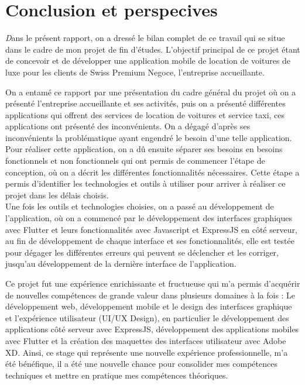 \chapter*{Conclusion et perspecives}
\vspace{1cm}
\justifying
\lettrine[findent=2pt,lines=3]{\textit{D}}{}ans le présent rapport, on a dressé le bilan complet de ce travail qui se situe dans le cadre de mon projet de fin d'études. L'objectif principal de ce projet étant de concevoir et de développer une application mobile de location de voitures de luxe pour les clients de Swiss Premium Negoce, l'entreprise accueillante.

On a entamé ce rapport par une présentation du cadre général du projet où on a présenté l'entreprise accueillante et ses activités, puis on a présenté différentes applications qui offrent des services de location de voitures et service taxi, ces applications ont présenté des inconvénients. On a dégagé d'après ses inconvénients la problématique ayant engendré le besoin d'une telle application. Pour réaliser cette application, on a dû ensuite séparer ses besoins en besoins fonctionnels et non fonctionnels qui ont permis de commencer l'étape de conception, où on a décrit les différentes fonctionnalités nécessaires. Cette étape a permis d'identifier les technologies et outils à utiliser pour arriver à réaliser ce projet dans les délais choisis.\\
\noindent Une fois les outils et technologies choisies, on a passé au développement de l'application, où on a commencé par le développement des interfaces graphiques avec Flutter et leurs fonctionnalités avec Javascript et ExpressJS en côté serveur, au fin de développement de chaque interface et ses fonctionnalités, elle est testée pour dégager les différentes erreurs qui peuvent se déclencher et les corriger, jusqu'au développement de la dernière interface de l'application.

Ce projet fut une expérience enrichissante et fructueuse qui m'a permis d'acquérir de nouvelles compétences de grande valeur dans plusieurs domaines à la fois : Le développement web, développement mobile et le design des interfaces graphique et l'expérience utilisateur (UI/UX Design), en particulier le développement des applications côté serveur avec ExpressJS, développement des applications mobiles avec Flutter et la création des maquettes des interfaces utilisateur avec Adobe XD. Ainsi, ce stage qui représente une nouvelle expérience professionnelle, m'a été bénéfique, il a été une nouvelle chance pour consolider mes compétences techniques et mettre en pratique mes compétences théoriques.

